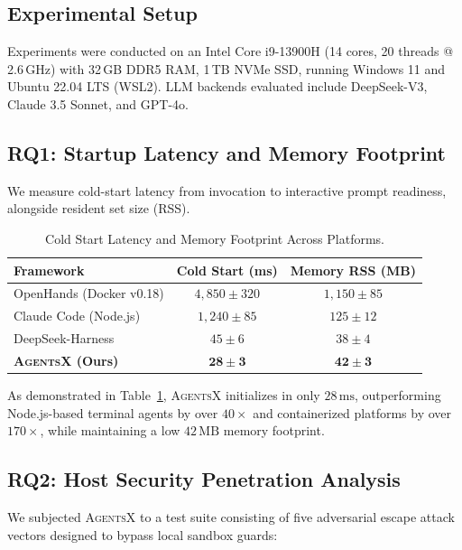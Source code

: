 \documentclass[10pt,twocolumn,letterpaper]{article}
\begin{document}
\subsection{Experimental Setup}
Experiments were conducted on an Intel Core i9-13900H (14 cores, 20 threads @ 2.6\,GHz) with 32\,GB DDR5 RAM, 1\,TB NVMe SSD, running Windows 11 and Ubuntu 22.04 LTS (WSL2). LLM backends evaluated include DeepSeek-V3, Claude 3.5 Sonnet, and GPT-4o.

\subsection{RQ1: Startup Latency and Memory Footprint}
We measure cold-start latency from invocation to interactive prompt readiness, alongside resident set size (RSS).

\begin{table}[htbp]
\centering
\small
\caption{Cold Start Latency and Memory Footprint Across Platforms.}
\label{tab:perf}
\begin{tabular}{lcc}
\toprule
\textbf{Framework} & \textbf{Cold Start (ms)} & \textbf{Memory RSS (MB)} \\
\midrule
OpenHands (Docker v0.18) & $4,850 \pm 320$ & $1,150 \pm 85$ \\
Claude Code (Node.js) & $1,240 \pm 85$ & $125 \pm 12$ \\
DeepSeek-Harness & $45 \pm 6$ & $38 \pm 4$ \\
\textbf{\textsc{AgentsX} (Ours)} & $\mathbf{28 \pm 3}$ & $\mathbf{42 \pm 3}$ \\
\bottomrule
\end{tabular}
\end{table}

As demonstrated in Table~\ref{tab:perf}, \textsc{AgentsX} initializes in only $28\,\text{ms}$, outperforming Node.js-based terminal agents by over $40\times$ and containerized platforms by over $170\times$, while maintaining a low $42\,\text{MB}$ memory footprint.

\subsection{RQ2: Host Security Penetration Analysis}
We subjected \textsc{AgentsX} to a test suite consisting of five adversarial escape attack vectors designed to bypass local sandbox guards:
\end{document}

